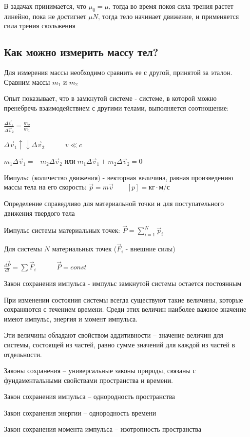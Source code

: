 \documentclass[12pt]{article}
\begin{document}
    В задачах принимается, что $\mu_0 = \mu$, тогда во время покоя сила трения растет линейно, пока не достигнет $\mu N$, тогда тело начинает движение, и применяется сила трения скольжения

    \subsection{Как можно измерить массу тел?}

    Для измерения массы необходимо сравнить ее с другой, принятой за эталон. Сравним массы $m_1$ и $m_2$

    Опыт показывает, что в замкнутой системе - системе, в которой можно пренебречь взаимодействием с другими телами,
    выполняется соотношение:

    $\frac{\Delta \vec{v}_1}{\Delta \vec{v}_2} = \frac{m_2}{m_1}$

    $\Delta \vec{v}_1 \uparrow \downarrow \Delta \vec{v}_2 \quad\quad\quad v \ll c$

    $m_1 \Delta \vec{v}_1 = -m_2 \Delta \vec{v}_2$ или $m_1 \Delta \vec{v}_1 + m_2 \Delta \vec{v}_2 = 0$

    Импульс (количество движения) - векторная величина, равная произведению массы тела на его скорость: $\vec{p} = m\vec{v} \quad\quad [p] = \text{кг} \cdot \text{м/с}$

    Определение справедливо для материальной точки и для поступательного движения твердого тела

    Импульс системы материальных точек: $\vec{P} = \sum_{i = 1}^N \vec{p}_i$

    Для системы $N$ материальных точек ($\vec{F}_i$ - внешние силы)

    $\frac{d\vec{P}}{dt} = \sum \vec{F}_i \quad\quad\quad \vec{P} = const$

    Закон сохранения импульса - импульс замкнутой системы остается постоянным


    При изменении состояния системы всегда существуют такие величины, которые сохраняются с течением времени. Среди этих величин наиболее важное значение имеют импульс, энергия и момент импульса.

    Эти величины обладают свойством аддитивности – значение величин для системы, состоящей из частей, равно сумме значений для каждой из частей в отдельности.

    Законы сохранения – универсальные законы природы, связаны с фундаментальными свойствами пространства и времени.

    \begin{center}
        Закон сохранения импульса – однородность пространства

        Закон сохранения энергии – однородность времени

        Закон сохранения момента импульса – изотропность пространства
    \end{center}
\end{document}
